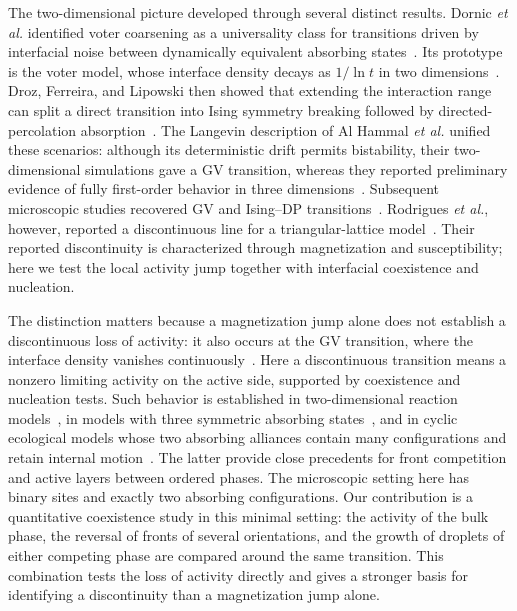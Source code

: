 \documentclass[pre,twocolumn,superscriptaddress,showpacs,floatfix]{revtex4-2}
\begin{document}
The two-dimensional picture developed through several distinct results. Dornic \emph{et al.}
identified voter coarsening as a universality class for transitions driven by interfacial
noise between dynamically equivalent absorbing states~\cite{dornic2001}. Its prototype is the
voter model, whose interface density decays as $1/\ln t$ in two
dimensions~\cite{clifford1973,holley1975,cox1986,krapivsky1992}. Droz, Ferreira, and Lipowski
then showed that extending the interaction range can split a direct transition into Ising
symmetry breaking followed by directed-percolation absorption~\cite{droz2003}. The Langevin
description of Al Hammal \emph{et al.} unified these scenarios: although its deterministic
drift permits bistability, their two-dimensional simulations gave a GV transition, whereas
they reported preliminary evidence of fully first-order behavior in three
dimensions~\cite{alhammal2005}. Subsequent
microscopic studies recovered GV and Ising--DP transitions~\cite{vazquez2008,castellano2009,azizi2020}.
Rodrigues \emph{et al.}, however, reported a discontinuous line for a triangular-lattice
model~\cite{rodrigues2015}. Their reported discontinuity is characterized through
magnetization and susceptibility; here we test the local activity jump together
with interfacial coexistence and nucleation.

The distinction matters because a magnetization jump alone does not establish a
discontinuous loss of activity: it also occurs at the GV transition, where the interface
density vanishes continuously~\cite{dornic2001,alhammal2005}. Here a discontinuous transition
means a nonzero limiting activity on the active side, supported by coexistence
and nucleation tests. Such behavior is established in two-dimensional reaction
models~\cite{ziff1986,bidaux1989,lubeck2006}, in models with three symmetric absorbing
states~\cite{lipowski2002,azizi2018}, and in cyclic ecological models whose two absorbing
alliances contain many configurations and retain internal motion~\cite{szabo2004,guisoni2013}.
The latter provide close precedents for front competition and active layers between ordered
phases. The microscopic setting here has binary sites and exactly two absorbing
configurations. Our contribution is a quantitative coexistence study in this minimal
setting: the activity of the bulk phase, the reversal of fronts of several orientations,
and the growth of droplets of either competing phase are compared around the same
transition. This combination tests the loss of activity directly and gives a stronger
basis for identifying a discontinuity than a magnetization jump alone.
\end{document}
